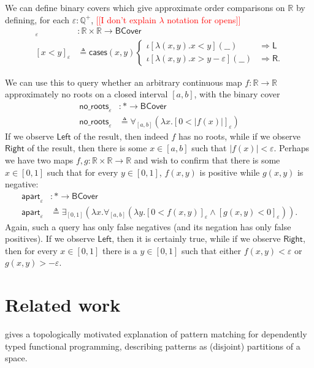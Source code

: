 \documentclass[conference]{IEEEtran}
\newcommand{\R}{\mathbb{R}}
\newcommand{\rat}{\mathbb{Q}}
\newcommand{\One}{\ast}
\newcommand{\wildcard}{\_\_}
\newcommand{\oinclf}[1]{\iota[{#1}]}
\newcommand{\oincl}[2]{\oinclf{#1} \left({#2}\right)}
\newcommand{\Branch}{\Rightarrow}
\newcommand{\note}[1]{\textcolor{red}{[[{#1}]]}}
\begin{document}
We can define binary covers which give approximate order comparisons on $\R$ by defining, for each $\varepsilon : \rat^+$,
\note{I don't explain $\lambda$ notation for opens}
\begin{align*}
[ \cdot < \cdot ]_\varepsilon &: \R \times \R \to \mathsf{BCover}
\\ [x < y]_\varepsilon &\triangleq \mathsf{cases}(x, y)
\begin{cases}
\oincl{\lambda (x, y). x < y}{\wildcard} &\Branch \mathsf{L}
\\ \oincl{\lambda (x, y). x > y - \varepsilon}{\wildcard} &\Branch \mathsf{R}.
\end{cases}
\end{align*}

We can use this to query whether an arbitrary continuous map $f : \R \to \R$ approximately no roots on a closed interval $[a, b]$, with the binary cover
\begin{align*}
\mathsf{no\_roots}_{\varepsilon} &: \One \to \mathsf{BCover}
\\ \mathsf{no\_roots}_\varepsilon &\triangleq
  \forall_{[a,b]}(\lambda x. [ 0 < |f(x)| ]_\varepsilon)
\end{align*}
If we observe $\mathsf{Left}$ of the result, then indeed $f$ has no roots, while if we observe $\mathsf{Right}$ of the result, then there is some $x \in [a, b]$ such that $|f(x)| < \varepsilon$. Perhaps we have two maps $f, g : \R \times \R \to \R$ and wish to confirm that there is some $x \in [0,1]$ such that for every $y \in [0,1]$, $f(x, y)$ is positive while $g(x,y)$ is negative:
\begin{align*}
\mathsf{apart}_{\varepsilon} &: \One \to \mathsf{BCover}
\\ \mathsf{apart}_\varepsilon &\triangleq
  \exists_{[0,1]}(\lambda x. \forall_{[a,b]}(\lambda y. [ 0 < f(x, y) ]_\varepsilon \wedge [g(x, y) < 0]_\varepsilon)).
\end{align*}
Again, such a query has only false negatives (and its negation has only false positives). If we observe $\mathsf{Left}$, then it is certainly true, while if we observe $\mathsf{Right}$, then for every $x \in [0,1]$ there is a $y \in [0,1]$ such that either $f(x, y) < \varepsilon$ or $g(x, y) > -\varepsilon$.

\section{Related work}

\cite{coquand1992} gives a topologically motivated explanation of pattern matching for dependently typed functional programming, describing patterns as (disjoint) partitions of a space.
\end{document}
